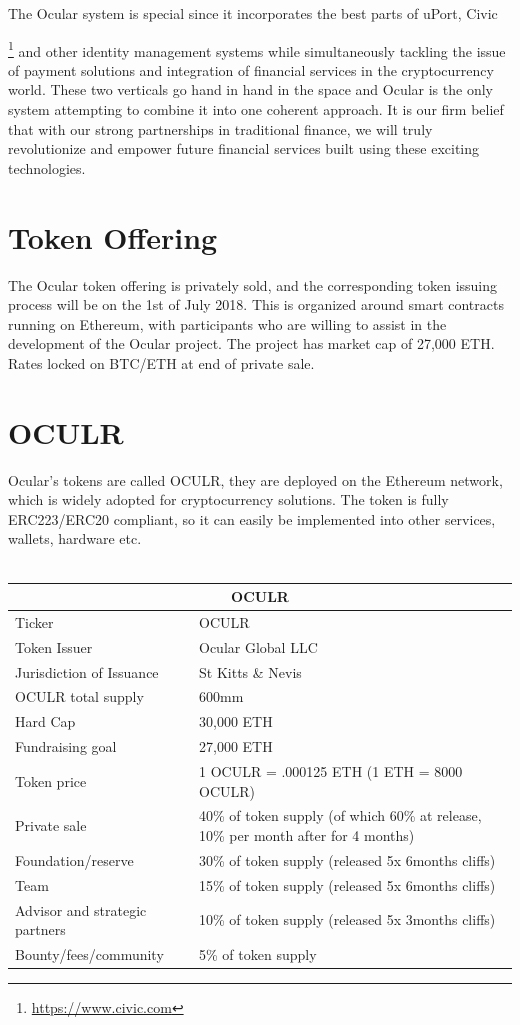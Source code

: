 \documentclass[a4paper]{article}
\begin{document}
The Ocular system is special since it incorporates the best parts of uPort, Civic{\footnote{\url{https://www.civic.com}} and other identity management systems while simultaneously tackling the issue of payment solutions and integration of financial services in the cryptocurrency world. These two verticals go hand in hand in the space and Ocular is the only system attempting to combine it into one coherent approach. It is our firm belief that with our strong partnerships in traditional finance, we will truly revolutionize and empower future financial services built using these exciting technologies. 

\clearpage
\section{Token Offering}
The Ocular token offering is privately sold, and the corresponding token issuing process will be on the 1st of July 2018. This is organized around smart contracts running on Ethereum, with participants who are willing to assist in the development of the Ocular project. The project has market cap of 27,000 ETH. Rates locked on BTC/ETH at end of private sale.

\section{OCULR}
Ocular’s tokens are called OCULR, they are deployed on the Ethereum network, which is widely adopted for cryptocurrency solutions.  The token is fully ERC223/ERC20 compliant, so it can easily be implemented into other services, wallets, hardware etc.
\\
\\
{
\begin{tabular}{ |p{4.1cm}|p{5.3cm}|  }
\hline
\multicolumn{2}{|c|}{OCULR} \\
\hline
Ticker & OCULR \\
Token Issuer & Ocular Global LLC \\
Jurisdiction of Issuance & St Kitts \& Nevis\\
OCULR total supply & 600mm \\
Hard Cap    &30,000 ETH \\
Fundraising goal & 27,000 ETH \\
Token price & 1 OCULR = .000125 ETH (1 ETH = 8000 OCULR)    \\
Private sale & 40\% of token supply (of which 60\% at release, 10\% per month after for 4 months)  \\
Foundation/reserve & 30\% of token supply (released 5x 6months cliffs) \\
Team & 15\% of token supply (released 5x 6months cliffs) \\
Advisor and strategic partners & 10\% of token supply (released 5x 3months cliffs) \\
Bounty/fees/community & 5\% of token supply \\
\hline
\end{tabular}

}}
\end{document}
